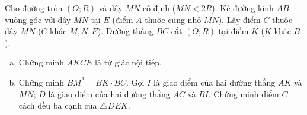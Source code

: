 \begin{ex} %
	Cho đường tròn $(O;R)$ và dây $MN$ cố định ($MN < 2R$). Kẻ đường kính $AB$ vuông góc với dây $MN$ tại $E$ (điểm $A$ thuộc cung nhỏ $MN$). Lấy điểm $C$ thuộc dây $MN$ ($C$ khác $M, N, E$). Đường thẳng $BC$ cắt $(O;R)$ tại điểm $K$ ($K$ khác $B$).
	\begin{enumerate}[a)]
		\item Chứng minh $AKCE$ là tứ giác nội tiếp.
		\item Chứng minh $BM^2 = BK \cdot BC$. Gọi $I$ là giao điểm của hai đường thẳng $AK$ và $MN$; $D$ là giao điểm của hai đường thẳng $AC$ và $BI$. Chứng minh điểm $C$ cách đều ba cạnh của $\triangle DEK$.
	\end{enumerate}
	\loigiai{}
\end{ex}


